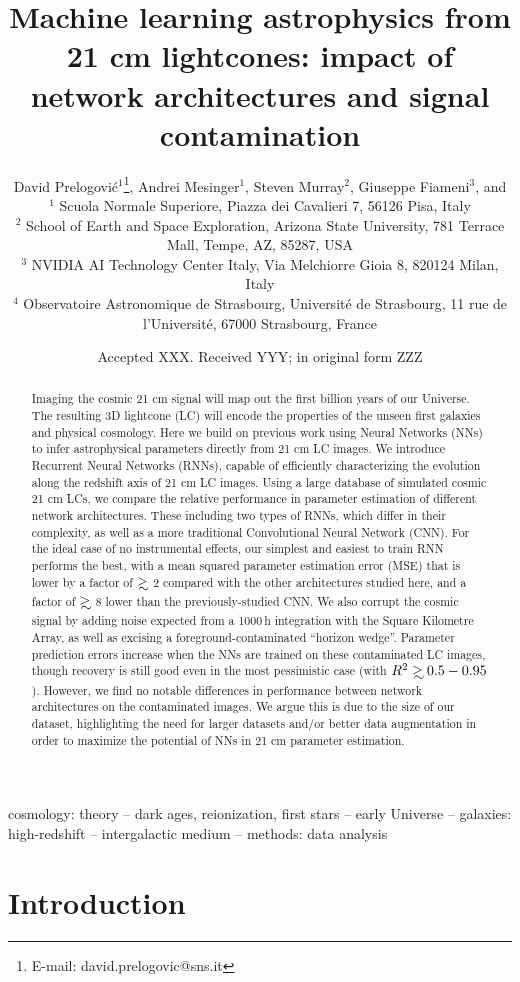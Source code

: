 \documentclass[fleqn,usenatbib]{mnras}
\title[RNNs for 21 cm lightcones]{Machine learning  astrophysics from 21 cm lightcones: impact of network architectures and signal contamination}
\author[Prelogović et al.]{David Prelogović$^{1}$\thanks{E-mail: david.prelogovic@sns.it}, Andrei Mesinger$^1$, Steven Murray$^2$, Giuseppe Fiameni$^{3}$, and \newauthor{Nicolas Gillet$^4$}\\
	$^{1}$ Scuola Normale Superiore, Piazza dei Cavalieri 7, 56126 Pisa, Italy\\
	$^{2}$ School of Earth and Space Exploration, Arizona State University, 781 Terrace Mall, Tempe, AZ, 85287, USA \\
	$^{3}$ NVIDIA AI Technology Center Italy, Via Melchiorre Gioia 8, 820124 Milan, Italy\\
	$^{4}$ Observatoire Astronomique de Strasbourg, Université de Strasbourg, 11 rue de l’Université, 67000 Strasbourg, France
}
\date{Accepted XXX. Received YYY; in original form ZZZ}
\newcommand\gsim{\mathrel{\rlap{\lower4pt\hbox{\hskip1pt$\sim$}}
        \raise1pt\hbox{$>$}}}
\begin{document}
\label{firstpage}
\pagerange{\pageref{firstpage}--\pageref{lastpage}}
\maketitle

\begin{abstract}
 Imaging the cosmic 21 cm signal will map out the first billion years of our Universe. The resulting 3D lightcone (LC) will encode the properties of the unseen first galaxies and physical cosmology. 
Here we build on previous work using Neural Networks (NNs) to infer astrophysical parameters directly from 21 cm LC images.  We introduce Recurrent Neural Networks (RNNs), capable of efficiently characterizing the evolution along the redshift axis of 21 cm LC images.  Using a large database of simulated cosmic 21 cm LCs, we compare the relative performance in parameter estimation of different network architectures.  These including two types of RNNs, which differ in their complexity, as well as a more traditional Convolutional Neural Network (CNN).
For the ideal case of no instrumental effects, our simplest and easiest to train RNN performs the best, with a mean squared parameter estimation error (MSE) that is lower by a factor of $\gsim$ 2 compared with the other architectures studied here, and a factor of $\gsim$ 8 lower than the previously-studied CNN.
We also corrupt the cosmic signal by adding noise expected from a 1000\,h integration with the Square Kilometre Array, as well as excising a foreground-contaminated \enquote{horizon wedge}.
Parameter prediction errors increase when the NNs are trained on these contaminated LC images, though recovery is still good even in the most pessimistic case (with $R^2 \gsim 0.5 - 0.95$).  However, we find no notable differences in performance between network architectures on the contaminated images.
We argue this is due to the size of our dataset, highlighting the need for larger datasets and/or better data augmentation in order to maximize the potential of NNs in 21 cm parameter estimation.

\end{abstract}

\begin{keywords}
cosmology: theory -- dark ages, reionization, first stars -- early Universe -- galaxies: high-redshift -- intergalactic medium -- methods: data analysis
\end{keywords}

\section{Introduction}
\end{document}

